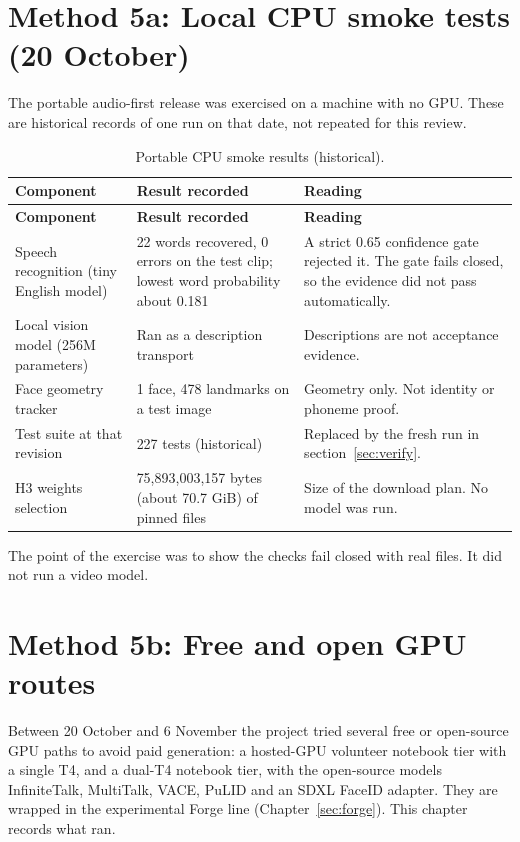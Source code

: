\documentclass[11pt,a4paper]{article}
\begin{document}
\section{Method 5a: Local CPU smoke tests (20 October)}
\label{sec:cpu}
The portable audio-first release was exercised on a machine with no GPU. These are historical records of one run on that date, not repeated for this review.
\begin{longtable}{@{}P{3.6cm}P{7.6cm}P{4.3cm}@{}}
\caption{Portable CPU smoke results (historical).}\\
\toprule \textbf{Component} & \textbf{Result recorded} & \textbf{Reading}\\ \midrule\endfirsthead
\toprule \textbf{Component} & \textbf{Result recorded} & \textbf{Reading}\\ \midrule\endhead
Speech recognition (tiny English model) & 22 words recovered, 0 errors on the test clip; lowest word probability about 0.181 & A strict 0.65 confidence gate rejected it. The gate fails closed, so the evidence did not pass automatically.\\
Local vision model (256M parameters) & Ran as a description transport & Descriptions are not acceptance evidence.\\
Face geometry tracker & 1 face, 478 landmarks on a test image & Geometry only. Not identity or phoneme proof.\\
Test suite at that revision & 227 tests (historical) & Replaced by the fresh run in section~\ref{sec:verify}.\\
H3 weights selection & 75,893,003,157 bytes (about 70.7 GiB) of pinned files & Size of the download plan. No model was run.\\
\bottomrule
\end{longtable}
The point of the exercise was to show the checks fail closed with real files. It did not run a video model.

\section{Method 5b: Free and open GPU routes}
\label{sec:freegpu}
Between 20 October and 6 November the project tried several free or open-source GPU paths to avoid paid generation: a hosted-GPU volunteer notebook tier with a single T4, and a dual-T4 notebook tier, with the open-source models InfiniteTalk, MultiTalk, VACE, PuLID and an SDXL FaceID adapter. They are wrapped in the experimental Forge line (Chapter~\ref{sec:forge}). This chapter records what ran.
\end{document}
